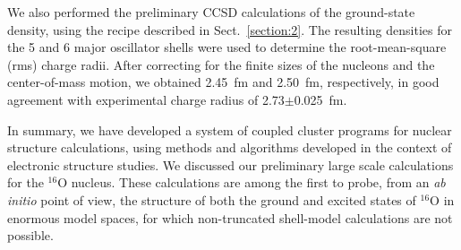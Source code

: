 \documentclass[epj]{svjour}
\begin{document}
We also performed the preliminary CCSD calculations
of the ground-state density, using the recipe described in Sect.~\ref{section:2}.
The resulting densities
for the 5 and 6 major oscillator shells were used to determine
the root-mean-square (rms) charge radii. After correcting
for the finite sizes of the nucleons and the center-of-mass motion,
we obtained 2.45~fm and 2.50~fm, respectively, in good
agreement with experimental charge radius of
2.73$\pm$0.025~fm.

In summary, we have developed a system of coupled cluster programs
for nuclear structure calculations, using methods and algorithms developed
in the context of electronic structure studies.
We discussed our preliminary large scale calculations for the
$^{16}$O nucleus. These calculations
are among the first to probe, from an {\it ab initio} point of view,
the structure of both the ground and excited states of $^{16}$O
in enormous model spaces, for
which non-truncated shell-model calculations are not possible.
\end{document}
